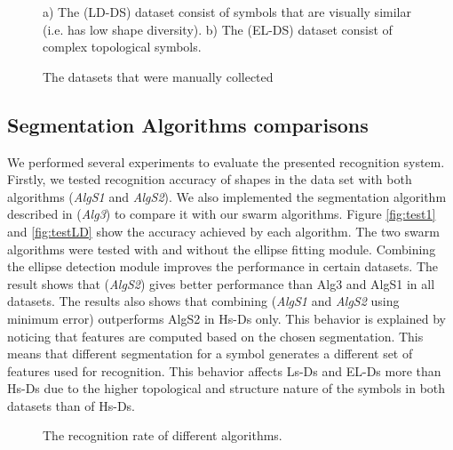 \documentclass[preprint,1p,times,review]{elsarticle}
\begin{document}
 \begin{figure}
\hspace{1in}

	\caption{The datasets that were manually collected}  a)  The (LD-DS) dataset consist of symbols that are visually similar (i.e. has low shape diversity). b) The (EL-DS) dataset consist of complex topological symbols.
\end{figure}

\subsection{Segmentation Algorithms comparisons}
\label{sec:AlgExp}
We performed several experiments to evaluate the presented recognition system. Firstly, we tested recognition accuracy of shapes in the data set with both algorithms (\textsl{AlgS1} and \textsl{AlgS2}). We also implemented the segmentation algorithm described in \cite{earlyprocess} (\textsl{Alg3}) to compare it with our swarm algorithms. Figure \ref{fig:test1} and \ref{fig:testLD} show the accuracy achieved by each algorithm. The two swarm algorithms were tested with and without the ellipse fitting module. Combining the ellipse detection module improves the performance in certain datasets. The result shows that (\textsl{AlgS2}) gives better performance than Alg3 and AlgS1 in all datasets.  The results also shows that combining (\textsl{AlgS1} and \textsl{AlgS2} using minimum error) outperforms AlgS2 in Hs-Ds only. This behavior is explained by noticing that features are computed based on the chosen segmentation. This means that different segmentation for a symbol generates a different set of features used for recognition. This behavior affects Ls-Ds and EL-Ds more than Hs-Ds due to the higher topological and structure nature of the symbols in both datasets than of Hs-Ds.

 \begin{figure}
	\centering
	 	\caption{ The recognition rate of different algorithms. }
 \end{figure}
\end{document}
